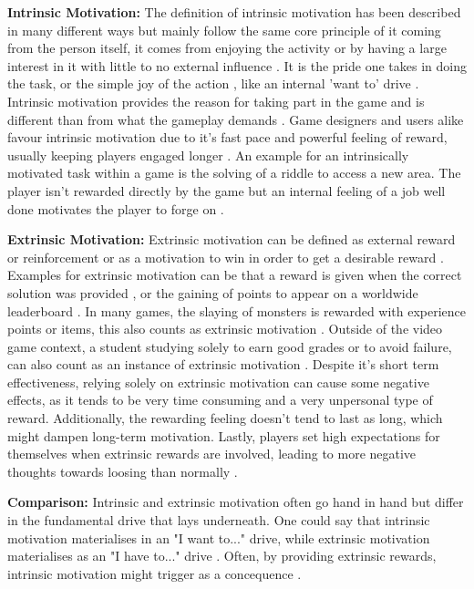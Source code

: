 \textbf{Intrinsic Motivation:}
The definition of intrinsic motivation has been described in many different ways but mainly follow the same core principle of it coming from the person itself, it comes from enjoying the activity or by having a large interest in it with little to no external influence \cite{corners} \cite{equilibrium}.
It is the pride one takes in doing the task, or the simple joy of the action \cite{domestic}, like an internal 'want to' drive \cite{equilibrium}.
Intrinsic motivation provides the reason for taking part in the game and is different than from what the gameplay demands \cite{mmo}.
Game designers and users alike favour intrinsic motivation due to it's fast pace and powerful feeling of reward, usually keeping players engaged longer \cite{corners}.
An example for an intrinsically motivated task within a game is the solving of a riddle to access a new area. The player isn't rewarded directly by the game but an internal feeling of a job well done motivates the player to forge on \cite{aspects}.

\textbf{Extrinsic Motivation:}
Extrinsic motivation can be defined as external reward or reinforcement \cite{domestic} or as a motivation to win in order to get a desirable reward \cite{corners}.
Examples for extrinsic motivation can be that a reward is given when the correct solution was provided \cite{mmo}, or the gaining of points to appear on a worldwide leaderboard \cite{aspects}. In many games, the slaying of monsters is rewarded with experience points or items, this also counts as extrinsic motivation \cite{corners}. Outside of the video game context, a student studying solely to earn good grades or to avoid failure, can also count as an instance of extrinsic motivation \cite{equilibrium}.
Despite it's short term effectiveness, relying solely on extrinsic motivation can cause some negative effects, as it tends to be very time consuming and a very unpersonal type of reward. Additionally, the rewarding feeling doesn't tend to last as long, which might dampen long-term motivation. Lastly, players set high expectations for themselves when extrinsic rewards are involved, leading to more negative thoughts towards loosing than normally \cite{corners}.

\textbf{Comparison:}
Intrinsic and extrinsic motivation often go hand in hand but differ in the fundamental drive that lays underneath. One could say that intrinsic motivation materialises in an "I want to..." drive, while extrinsic motivation materialises as an "I have to..." drive \cite{equilibrium}.
Often, by providing extrinsic rewards, intrinsic motivation might trigger as a concequence \cite{mmo}.

